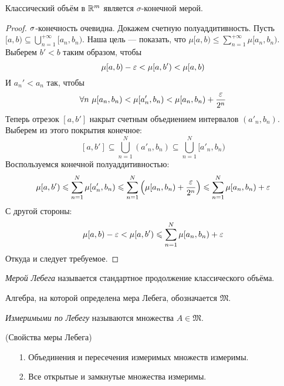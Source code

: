 \begin{theorem}
    Классический объём в $\mathbb{R}^m$ является $\sigma$-конечной мерой.
\end{theorem}
\begin{proof}
	$\sigma$-конечность очевидна. Докажем счетную полуаддитивность. Пусть 
	$[a, b) \subseteq \bigcup_{n = 1}^{+\infty}{[a_n, b_n)}$. Наша цель ---
	показать, что $\mu[a, b) \leqslant \sum_{n = 1}^{+\infty}{\mu[a_n, b_n)}$.
	Выберем $b' < b$ таким образом, чтобы 
\[
	\mu[a, b) - \varepsilon < \mu[a, b') < \mu[a, b)
\]
	И $a_n' < a_n$ так, чтобы
\[
	\forall n~ \mu[a_n, b_n) < \mu[a_n', b_n) < \mu[a_n, b_n) + \frac{\varepsilon}{2^n}
\]
	Теперь отрезок $[a, b']$ накрыт счетным объедиением интервалов $(a'_n, b_n)$. 
	Выберем из этого покрытия конечное:
\[
	[a, b'] \subseteq \bigcup_{n = 1}^{N}{(a'_n, b_n)} \subseteq 
	\bigcup_{n = 1}^{N}{[a'_n, b_n)}
\]
	Воспользуемся конечной полуаддитивностью:
\[
	\mu[a, b') \leqslant \sum_{n = 1}^{N}{\mu[a'_n, b_n)} \leqslant
	\sum_{n = 1}^{N}{\left(\mu[a_n, b_n) + \frac{\varepsilon}{2^n}\right)} \leqslant
	\sum_{n = 1}^{N}{\mu[a_n, b_n)} + \varepsilon
\]
	С другой стороны:
\[
	\mu[a, b) - \varepsilon < \mu[a, b') \leqslant \sum_{n = 1}^{N}{\mu[a_n, b_n)} + \varepsilon
\]
	Откуда и следует требуемое.
\end{proof}

\begin{definition}
    \textit{Мерой Лебега} называется стандартное продолжение классического объёма.
\end{definition}

\begin{definition}
    Алгебра, на которой определена мера Лебега, обозначается $\mathfrak{M}$.
\end{definition}

\begin{definition}
    \textit{Измеримыми по Лебегу} называются множества $A \in \mathfrak{M}$.
\end{definition}
	
\begin{theorem}(Свойства меры Лебега)
    \begin{itemize}
        \item[1.] Объединения и пересечения измеримых множеств измеримы.
        \item[2.] Все открытые и замкнутые множества измеримы.
    \end{itemize}
\end{theorem}


